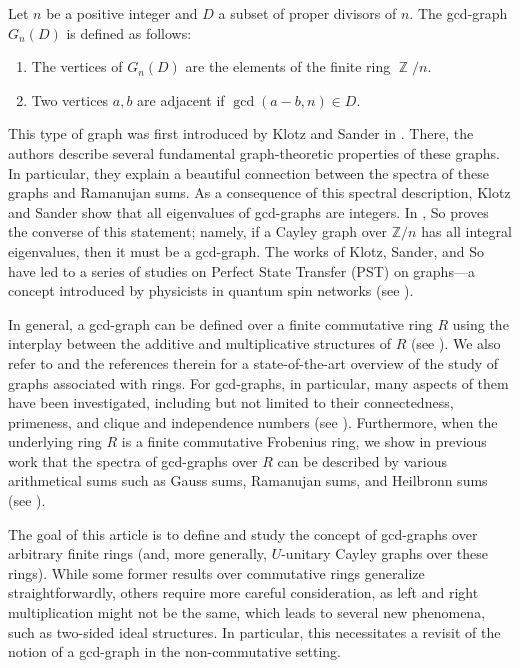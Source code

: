 \documentclass[12pt, a4paper]{amsart}
\theoremstyle{definition}
\DeclareMathOperator{\Z}{\mathbb{Z}}
\numberwithin{equation}{section}
\begin{document}
Let $n$ be a positive integer and $D$ a subset of proper divisors of $n$. The gcd-graph $G_n(D)$ is defined as follows: 

\begin{enumerate} 
\item The vertices of $G_n(D)$ are the elements of the finite ring $\Z/n$. 

\item Two vertices $a,b$ are adjacent if $\gcd(a-b, n) \in D.$  

\end{enumerate}
This type of graph was first introduced by Klotz and Sander in \cite{klotz2007some}. There, the authors describe several fundamental graph-theoretic properties of these graphs. In particular, they explain a beautiful connection between the spectra of these graphs and Ramanujan sums. As a consequence of this spectral description, Klotz and Sander show that all eigenvalues of gcd-graphs are integers. In \cite{so2006integral}, So proves the converse of this statement; namely, if a Cayley graph over $\mathbb{Z}/n$ has all integral eigenvalues, then it must be a gcd-graph. The works of Klotz, Sander, and So have led to a series of studies on Perfect State Transfer (PST) on graphs—a concept introduced by physicists in quantum spin networks (see \cite{bavsic2009perfect, BP2, saxena2007parameters, pst-gcd-new}).

In general, a gcd-graph can be defined over a finite commutative ring $R$ using the interplay between the additive and multiplicative structures of $R$ (see \cite{pst-gcd-new-2, minavc2024gcd, nguyengcd2026, pst-gcd-new}). We also refer to \cite{anderson2021graphs} and the references therein for a state-of-the-art overview of the study of graphs associated with rings. For gcd-graphs, in particular, many aspects of them have been investigated, including but not limited to their connectedness, primeness, and clique and independence numbers (see \cite{unitary, minavc2024gcd, nguyengcd2026, pst-gcd-new}). Furthermore, when the underlying ring $R$ is a finite commutative Frobenius ring, we show in previous work that the spectra of gcd-graphs over $R$ can be described by various arithmetical sums such as Gauss sums, Ramanujan sums, and Heilbronn sums (see \cite{nguyen2025supercharacters, nguyengcd2026}).

The goal of this article is to define and study the concept of gcd-graphs over arbitrary finite rings (and, more generally, $U$-unitary Cayley graphs over these rings). While some former results over commutative rings generalize straightforwardly, others require more careful consideration, as left and right multiplication might not be the same, which leads to several new phenomena, such as two-sided ideal structures. In particular, this necessitates a revisit of the notion of a gcd-graph in the non-commutative setting.
\end{document}

